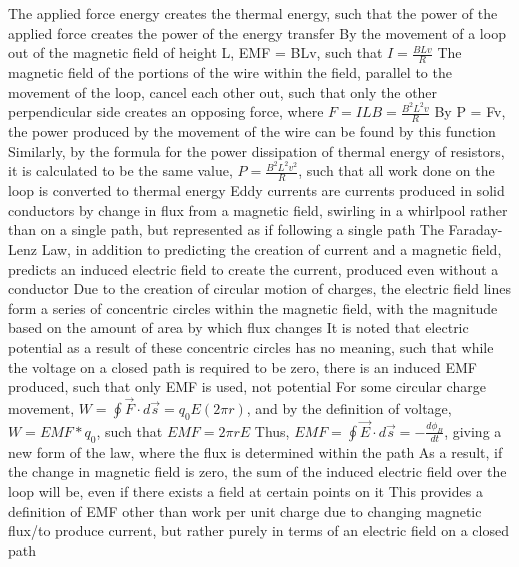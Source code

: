 \documentclass[11 pt, twoside]{article}
\newenvironment{outline*}
{
	\begin{outline}[enumerate]
	}
	{\end{outline}
}
\begin{document}
\begin{outline*}
\2 The applied force energy creates the thermal energy, such that the power of the applied force creates the power of the energy transfer
\2 By the movement of a loop out of the magnetic field of height L, EMF = BLv, such that $I = \frac{BLv}{R}$
\3 The magnetic field of the portions of the wire within the field, parallel to the movement of the loop, cancel each other out, such that only the other perpendicular side creates an opposing force, where $F = ILB = \frac{B^2L^2v}{R}$
\3 By P = Fv, the power produced by the movement of the wire can be found by this function
\2 Similarly, by the formula for the power dissipation of thermal energy of resistors, it is calculated to be the same value, $P = \frac{B^2L^2v^2}{R}$, such that all work done on the loop is converted to thermal energy
\1 Eddy currents are currents produced in solid conductors by change in flux from a magnetic field, swirling in a whirlpool rather than on a single path, but represented as if following a single path
\1 The Faraday-Lenz Law, in addition to predicting the creation of current and a magnetic field, predicts an induced electric field to create the current, produced even without a conductor
\2 Due to the creation of circular motion of charges, the electric field lines form a series of concentric circles within the magnetic field, with the magnitude based on the amount of area by which flux changes
\3 It is noted that electric potential as a result of these concentric circles has no meaning, such that while the voltage on a closed path is required to be zero, there is an induced EMF produced, such that only EMF is used, not potential
\2 For some circular charge movement, $W = \oint \vec{F} \cdot d\vec{s} = q_0E(2\pi r)$, and by the definition of voltage, $W = EMF*q_0$, such that $EMF = 2\pi rE$
\3 Thus, $EMF = \oint \vec{E} \cdot d\vec{s} = -\frac{d\phi_B}{dt}$, giving a new form of the law, where the flux is determined within the path
\3 As a result, if the change in magnetic field is zero, the sum of the induced electric field over the loop will be, even if there exists a field at certain points on it
\2 This provides a definition of EMF other than work per unit charge due to changing magnetic flux/to produce current, but rather purely in terms of an electric field on a closed path
\end{outline*}
\end{document}
